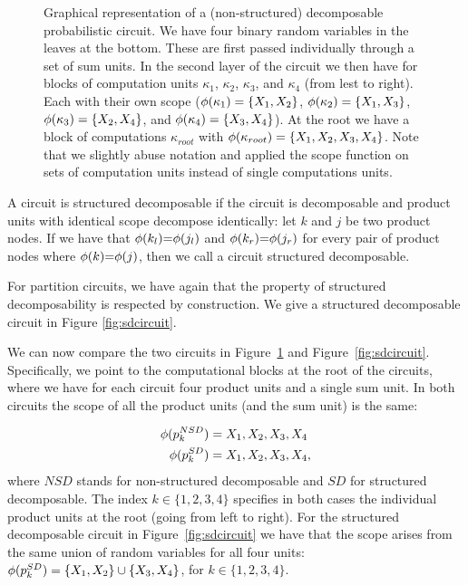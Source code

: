 \begin{figure}
	\centering

	
	\caption{Graphical representation of a (non-structured) decomposable probabilistic circuit. We have four binary random variables in the leaves at the bottom. These are first passed individually through a set of sum units. In the second layer of the circuit we then have for blocks of computation units $\kappa_1$, $\kappa_2$, $\kappa_3$, and $\kappa_4$ (from lest to right). Each with their own scope ($\phi(\kappa_1)= \{ X_1, X_2  \}$, $\phi(\kappa_2)= \{ X_1, X_3  \}$, $\phi(\kappa_3)= \{ X_2, X_4  \}$, and $\phi(\kappa_4)= \{ X_3, X_4  \}$). At the root we have a block of computations $\kappa_{root}$ with $\phi(\kappa_{root}) = \{ X_1, X_2, X_3, X_4 \}$. Note that we slightly abuse notation and applied the scope function on sets of computation units instead of single computations units.
	}
	\label{fig:dcircuit}
\end{figure}



\begin{definition}
	A circuit is structured decomposable if the circuit is decomposable and product units with identical scope decompose identically: let $k$ and $j$ be two product nodes. If we have that $\phi (k_l) {=} \phi(j_l)$ and $\phi (k_r) {=} \phi(j_r)$ for every pair of product nodes where $\phi(k) {=} \phi(j)$, then we call a circuit structured decomposable.
\end{definition}


For partition circuits, we have again that the property of structured decomposability is respected by construction.
We give a structured decomposable circuit in Figure \ref{fig:sdcircuit}.




We can now compare the two circuits in Figure~\ref{fig:dcircuit} and Figure~\ref{fig:sdcircuit}. Specifically, we point to the computational blocks at the root of the circuits, where we have for each circuit four product units and a single sum unit. In both circuits the scope of all the product units (and the sum unit) is the same:

\begin{align}
	\phi(p_{k}^{NSD}) & = {X_1,X_2,X_3,X_4 }
	\\
	\phi(p_{k}^{SD})  & = {X_1,X_2,X_3,X_4 },
\end{align}
where $NSD$ stands for non-structured decomposable and $SD$ for structured decomposable. The index $k \in \{1,2,3,4 \}$ specifies in both cases the individual product units at the root (going from left to right). For the structured decomposable circuit in Figure~\ref{fig:sdcircuit} we have that the scope arises from the same union of random variables for all four units: $\phi(p_{k}^{SD}) =  \{X_1,X_2 \} \cup \{X_3,X_4 \}$, for $k \in \{1,2,3,4 \}$.

